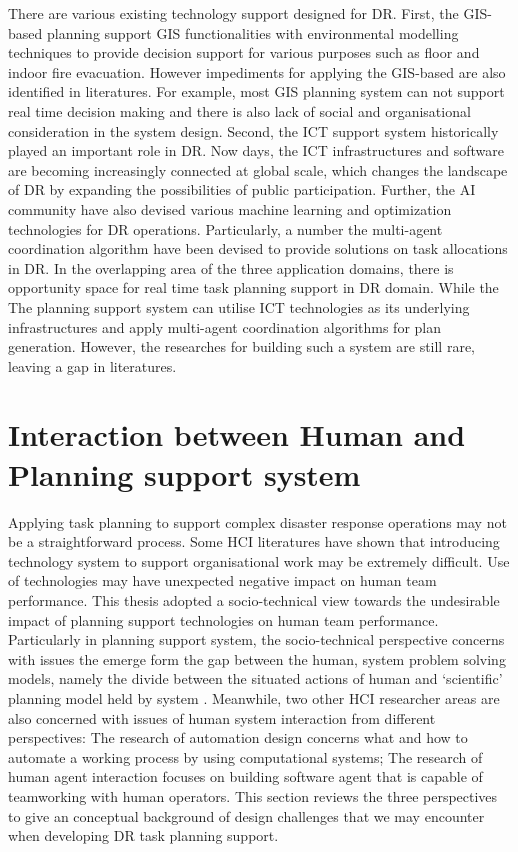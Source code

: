 There are various existing technology support designed for \ac{DR}. First, the \ac{GIS}-based planning support \ac{GIS} functionalities with environmental modelling techniques to provide decision support for various purposes such as floor and indoor fire evacuation. However impediments for applying the \ac{GIS}-based are also identified in literatures. For example, most \ac{GIS} planning system can not support real time decision making and there is also lack of social and organisational consideration in the system design. Second, the \ac{ICT} support system historically played an important role in \ac{DR}. Now days, the \ac{ICT} infrastructures and software are becoming increasingly connected at global scale, which changes the landscape of \ac{DR} by expanding the possibilities of public participation. Further, the \ac{AI} community have also devised various machine learning and optimization technologies for \ac{DR} operations. Particularly, a number the multi-agent coordination algorithm have been devised to provide solutions on task allocations in \ac{DR}. In the overlapping area of the three application domains, there is opportunity space for real time task planning support in \ac{DR} domain. While the The planning support system can utilise \ac{ICT} technologies as its underlying infrastructures and apply multi-agent coordination algorithms for plan generation. However, the researches for building such a system are still rare, leaving a gap in literatures.\\

\chapter{Interaction between Human and Planning support system}

Applying task planning to support complex disaster response operations may not be a straightforward process. Some \ac{HCI} literatures \cite{Ackerman2000,Bowers1994,Niazkhani2009} have shown that introducing technology system to support organisational work may be extremely difficult. Use of technologies may have unexpected negative impact on human team performance. This thesis adopted a socio-technical view towards the undesirable impact of planning support technologies on human team performance. Particularly in planning support system, the socio-technical perspective concerns with issues the emerge form the gap between the human, system problem solving models, namely the divide between the situated actions of human and `scientific' planning model held by system \cite{Suchman1987}. Meanwhile, two other \ac{HCI} researcher areas are also concerned with issues of human system interaction from different perspectives: The research of automation design concerns what and how to automate a working process by using computational systems; The research of human agent interaction focuses on building software agent that is capable of teamworking with human operators. This section reviews the three perspectives to give an conceptual background of design challenges that we may encounter when developing \ac{DR} task planning support.\\

